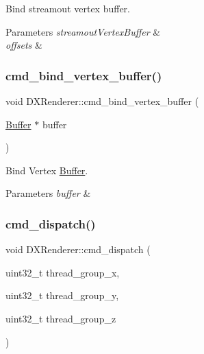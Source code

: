 Bind streamout vertex buffer. 


\begin{DoxyParams}{Parameters}
{\em streamout\+Vertex\+Buffer} & \\
\hline
{\em offsets} & \\
\hline
\end{DoxyParams}
\mbox{\label{classDXRenderer_a2030153a259929cd36f4750a60ea3a59}} 
\subsubsection{\texorpdfstring{cmd\+\_\+bind\+\_\+vertex\+\_\+buffer()}{cmd\_bind\_vertex\_buffer()}}
{\footnotesize\ttfamily void D\+X\+Renderer\+::cmd\+\_\+bind\+\_\+vertex\+\_\+buffer (\begin{DoxyParamCaption}\item[{\hyperlink{classBuffer}{Buffer} $\ast$}]{buffer }\end{DoxyParamCaption})}



Bind Vertex \hyperlink{classBuffer}{Buffer}. 


\begin{DoxyParams}{Parameters}
{\em buffer} & \\
\hline
\end{DoxyParams}
\mbox{\label{classDXRenderer_a477f9b9bec26bde95a0aeae3dd8b7395}} 
\subsubsection{\texorpdfstring{cmd\+\_\+dispatch()}{cmd\_dispatch()}}
{\footnotesize\ttfamily void D\+X\+Renderer\+::cmd\+\_\+dispatch (\begin{DoxyParamCaption}\item[{uint32\+\_\+t}]{thread\+\_\+group\+\_\+x,  }\item[{uint32\+\_\+t}]{thread\+\_\+group\+\_\+y,  }\item[{uint32\+\_\+t}]{thread\+\_\+group\+\_\+z }\end{DoxyParamCaption})}



